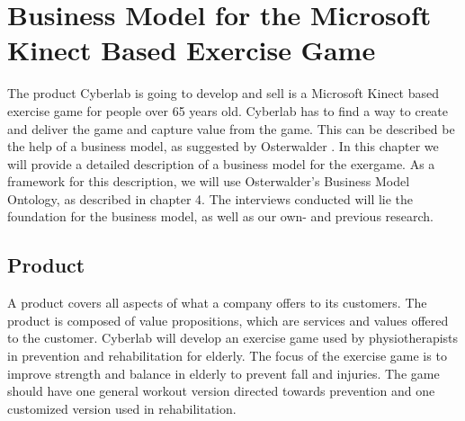 \chapter{Business Model for the Microsoft Kinect Based Exercise Game}
The product Cyberlab is going to develop and sell is a Microsoft Kinect based exercise game for people over 65 years old. Cyberlab has to find a way to create and deliver the game and capture value from the game. This can be described be the help of a business model, as suggested by Osterwalder \cite{osterwalder}. In this chapter we will provide a detailed description of a business model for the exergame. As a framework for this description, we will use Osterwalder's Business Model Ontology, as described in chapter 4. The interviews conducted will lie the foundation for the business model, as well as our own- and previous research. 

\section{Product}
A product covers all aspects of what a company offers to its customers. The product is composed of value propositions, which are services and values offered to the customer. Cyberlab will develop an exercise game used by physiotherapists in prevention and rehabilitation for elderly. The focus of the exercise game is to improve strength and balance in elderly to prevent fall and injuries. The game should have one general workout version directed towards prevention and one customized version used in rehabilitation.
